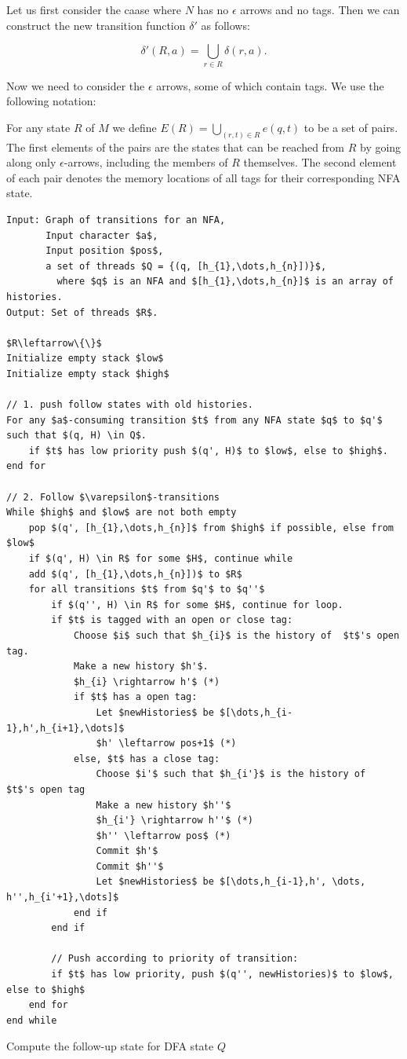 \documentclass[english]{sigplanconf}
\begin{document}
Let us first consider the caase where $N$ has no $\epsilon$ arrows
and no tags. Then we can construct the new transition function $\delta'$
as follows:

\[
\delta'(R,a)=\bigcup_{r\in R}\delta(r,a)\mbox{.}
\]

Now we need to consider the $\epsilon$ arrows, some of which contain
tags. We use the following notation:

For any state $R$ of $M$ we define $E(R)=\bigcup_{(r,t)\in R}e(q,t)$
to be a set of pairs. The first elements of the pairs are the states
that can be reached from $R$ by going along only $\epsilon$-arrows,
including the members of $R$ themselves. The second element of each
pair denotes the memory locations of all tags for their corresponding
NFA state.

\begin{algorithm*}[tb]
\begin{lstlisting}[mathescape,tabsize=2]
Input: Graph of transitions for an NFA,
	   Input character $a$,
	   Input position $pos$,
	   a set of threads $Q = {(q, [h_{1},\dots,h_{n}])}$,
	     where $q$ is an NFA and $[h_{1},\dots,h_{n}]$ is an array of histories.
Output: Set of threads $R$.

$R\leftarrow\{\}$
Initialize empty stack $low$
Initialize empty stack $high$

// 1. push follow states with old histories.
For any $a$-consuming transition $t$ from any NFA state $q$ to $q'$ such that $(q, H) \in Q$.
	if $t$ has low priority push $(q', H)$ to $low$, else to $high$.
end for

// 2. Follow $\varepsilon$-transitions
While $high$ and $low$ are not both empty
	pop $(q', [h_{1},\dots,h_{n}]$ from $high$ if possible, else from $low$
	if $(q', H) \in R$ for some $H$, continue while
	add $(q', [h_{1},\dots,h_{n}])$ to $R$
	for all transitions $t$ from $q'$ to $q''$
		if $(q'', H) \in R$ for some $H$, continue for loop.
		if $t$ is tagged with an open or close tag:
			Choose $i$ such that $h_{i}$ is the history of  $t$'s open tag.
			Make a new history $h'$.
			$h_{i} \rightarrow h'$ (*)
			if $t$ has a open tag:
				Let $newHistories$ be $[\dots,h_{i-1},h',h_{i+1},\dots]$
				$h' \leftarrow pos+1$ (*)
			else, $t$ has a close tag:
				Choose $i'$ such that $h_{i'}$ is the history of  $t$'s open tag
				Make a new history $h''$
				$h_{i'} \rightarrow h''$ (*)
				$h'' \leftarrow pos$ (*)
				Commit $h'$
				Commit $h''$
				Let $newHistories$ be $[\dots,h_{i-1},h', \dots, h'',h_{i'+1},\dots]$
			end if
		end if				
				
		// Push according to priority of transition:
		if $t$ has low priority, push $(q'', newHistories)$ to $low$, else to $high$
	end for
end while
\end{lstlisting}

\caption{Compute the follow-up state for DFA state $Q$}
\end{algorithm*}
\end{document}
